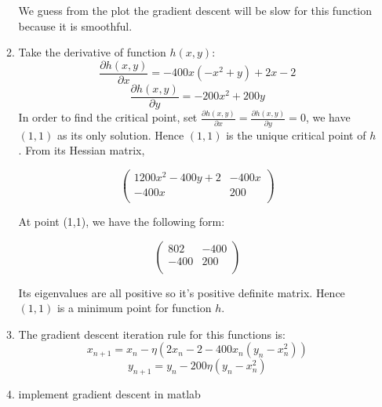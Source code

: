 \documentclass{article}
\begin{document}
\begin{enumerate}
\begin{enumerate}
We guess from the plot the gradient descent will be slow for this function because it is smoothful.
\item Take the derivative of function $h(x,y)$:
\[\frac{\partial h(x,y)}{\partial x} = -400x(-x^{2}+y)+2x-2\]
\[\frac{\partial h(x,y)}{\partial y} = -200x^{2}+200y\]
In order to find the critical point, set $\frac{\partial h(x,y)}{\partial x} =\frac{\partial h(x,y)}{\partial y}=0$, we have $(1,1)$ as its only solution. Hence $(1,1)$ is the unique critical point of $h$.
From its Hessian matrix,
\begin{center}
\[ 
\left(
\begin{array}{cc}
1200x^{2}-400y+2&-400x\\
-400x&200\\
\end{array}
\right)
\]
\end{center}
At point (1,1), we have the following form:

\begin{center}
\[ 
\left(
\begin{array}{cc}
802&-400\\
-400&200\\
\end{array}
\right)
\]
\end{center}
Its eigenvalues are all positive so it's positive definite matrix. Hence $(1,1)$ is a minimum point for function $h$.  


\item The gradient descent iteration rule for this functions is:
\[x_{n+1}=x_{n}-\eta(2x_{n}-2-400x_n(y_n-x_{n}^{2}))\]
\[y_{n+1}=y_{n}-200\eta (y_{n}-x_{n}^{2})\]
\item implement gradient descent in matlab 


\end{enumerate}
\end{enumerate}
\end{document}
